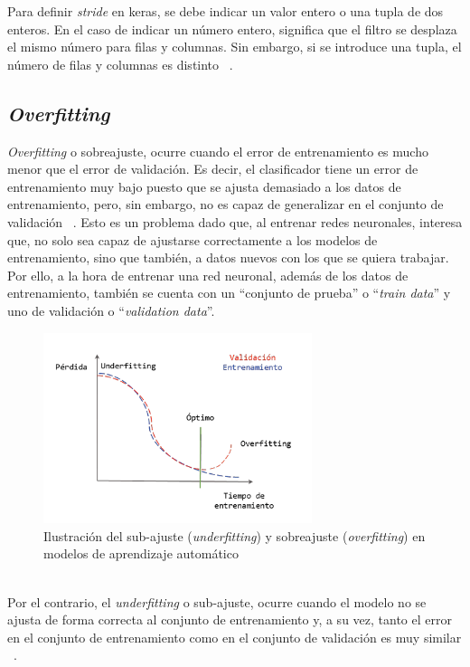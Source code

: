 Para definir \textit{stride} en keras, se debe indicar un valor entero o una tupla de dos enteros. En el caso de indicar un número entero, significa que el filtro se desplaza el mismo número para filas y columnas. Sin embargo, si se introduce una tupla, el número de filas y columnas es distinto ~\cite{diego23}.

\subsection{\textit{Overfitting}}
\textit{Overfitting} o sobreajuste, ocurre cuando el error de entrenamiento es mucho menor que el error de validación. Es decir, el clasificador tiene un error de entrenamiento muy bajo puesto que se ajusta demasiado a los datos de entrenamiento, pero, sin embargo, no es capaz de generalizar en el conjunto de validación ~\cite{diego23}.  Esto es un problema dado que, al entrenar redes neuronales, interesa que, no solo sea capaz de ajustarse correctamente a los modelos de entrenamiento, sino que también, a datos nuevos con los que se quiera trabajar. Por ello, a la hora de entrenar una red neuronal, además de los datos de entrenamiento, también se cuenta con un ``conjunto de prueba'' o ``\textit{train data}'' y uno de validación o ``\textit{validation data}''. 


\begin{figure}[h]
    \centering
    \includegraphics[width=0.70\textwidth]{img/sobreajuste.PNG}
    \caption{Ilustración del sub-ajuste (\textit{underfitting}) y sobreajuste (\textit{overfitting}) en modelos de aprendizaje automático\\ ~\cite{diego23}}
    \label{fig:sobreajuste}
\end{figure}
\FloatBarrier

Por el contrario, el \textit{underfitting} o sub-ajuste, ocurre cuando el modelo no se ajusta de forma correcta al conjunto de entrenamiento y, a su vez, tanto el error en el conjunto de entrenamiento como en el conjunto de validación es muy similar ~\cite{diego23}.

